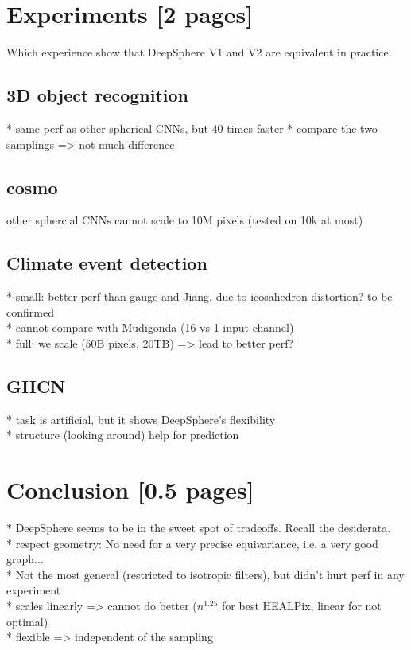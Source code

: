 \documentclass{article} %
\begin{document}
\section{Experiments [2 pages]}
Which experience show that DeepSphere V1 and V2 are equivalent in practice.

\subsection{3D object recognition}

* same perf as other spherical CNNs, but 40 times faster
* compare the two samplings => not much difference

\subsection{cosmo}

other sphercial CNNs cannot scale to 10M pixels (tested on 10k at most)

\subsection{Climate event detection}

* small: better perf than gauge and Jiang. due to icosahedron distortion? to be confirmed\\
* cannot compare with Mudigonda (16 vs 1 input channel)\\
* full: we scale (50B pixels, 20TB) => lead to better perf?\\

\subsection{GHCN}

* task is artificial, but it shows DeepSphere's flexibility\\
* structure (looking around) help for prediction\\

\section{Conclusion [0.5 pages]}

* DeepSphere seems to be in the sweet spot of tradeoffs. Recall the desiderata.\\
  * respect geometry: No need for a very precise equivariance, i.e. a very good graph...\\
  * Not the most general (restricted to isotropic filters), but didn't hurt perf in any experiment\\
  * scales linearly => cannot do better ($n^1.25$ for best HEALPix, linear for not optimal)\\
  * flexible => independent of the sampling\\
\end{document}
